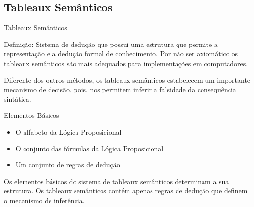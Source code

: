 
\subsection{Tableaux Semânticos}

\begin{frame}[t]

\vskip 3cm

\begin{center}
{\Huge Tableaux Semânticos}
\end{center}

\end{frame}


\begin{frame}{Definição:}
Sistema de dedução que possui uma estrutura que permite a representação e a dedução formal de conhecimento. Por não ser axiomático os tableaux semânticos são mais adequados para implementações em computadores.
\vspace{0,7 cm}

Diferente dos outros métodos, os tableaux semânticos estabelecem um importante mecanismo de decisão, pois, nos permitem inferir a falsidade da consequência sintática.
\end{frame}

\begin{frame}{Elementos Básicos}
\begin{itemize}
\item O alfabeto da Lógica Proposicional
\item O conjunto das fórmulas da Lógica Proposicional
\item Um conjunto de regras de dedução
\end{itemize}
\vspace{0,7 cm}
Os elementos básicos do sistema de tableaux semânticos determinam a sua estrutura. Os tableaux semânticos contém apenas regras de dedução que definem o mecanismo de inferência.
\end{frame}

